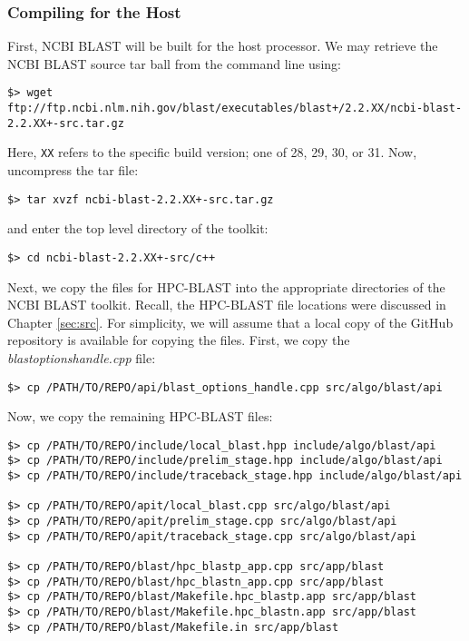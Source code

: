 \documentclass[10pt]{article}
\begin{document}
\subsubsection{Compiling for the Host} \label{sssec:ncbi-host}
First, NCBI BLAST will be built for the host processor.  We may retrieve the NCBI BLAST source tar ball from the command line using:
\begin{verbatim}
$> wget ftp://ftp.ncbi.nlm.nih.gov/blast/executables/blast+/2.2.XX/ncbi-blast-2.2.XX+-src.tar.gz
\end{verbatim}
\noindent Here, \verb^XX^ refers to the specific build version; one of 28, 29, 30, or 31.  Now, uncompress the tar file:
\begin{verbatim}
$> tar xvzf ncbi-blast-2.2.XX+-src.tar.gz
\end{verbatim}
\noindent and enter the top level directory of the toolkit:
\begin{verbatim}
$> cd ncbi-blast-2.2.XX+-src/c++
\end{verbatim}
\noindent Next, we copy the files for HPC-BLAST into the appropriate directories of the NCBI BLAST toolkit.  Recall, the HPC-BLAST file locations were discussed in Chapter \ref{sec:src}.  For simplicity, we will assume that a local copy of the
GitHub repository is available for copying the files.  First, we copy the \emph{blast\textunderscore options\textunderscore handle.cpp} file:
\footnotesize
\begin{verbatim}
$> cp /PATH/TO/REPO/api/blast_options_handle.cpp src/algo/blast/api
\end{verbatim}
\normalsize
\noindent Now, we copy the remaining HPC-BLAST files:
\footnotesize
\begin{verbatim}
$> cp /PATH/TO/REPO/include/local_blast.hpp include/algo/blast/api
$> cp /PATH/TO/REPO/include/prelim_stage.hpp include/algo/blast/api
$> cp /PATH/TO/REPO/include/traceback_stage.hpp include/algo/blast/api

$> cp /PATH/TO/REPO/apit/local_blast.cpp src/algo/blast/api
$> cp /PATH/TO/REPO/apit/prelim_stage.cpp src/algo/blast/api
$> cp /PATH/TO/REPO/apit/traceback_stage.cpp src/algo/blast/api

$> cp /PATH/TO/REPO/blast/hpc_blastp_app.cpp src/app/blast
$> cp /PATH/TO/REPO/blast/hpc_blastn_app.cpp src/app/blast
$> cp /PATH/TO/REPO/blast/Makefile.hpc_blastp.app src/app/blast
$> cp /PATH/TO/REPO/blast/Makefile.hpc_blastn.app src/app/blast
$> cp /PATH/TO/REPO/blast/Makefile.in src/app/blast
\end{verbatim}
\normalsize
\end{document}
